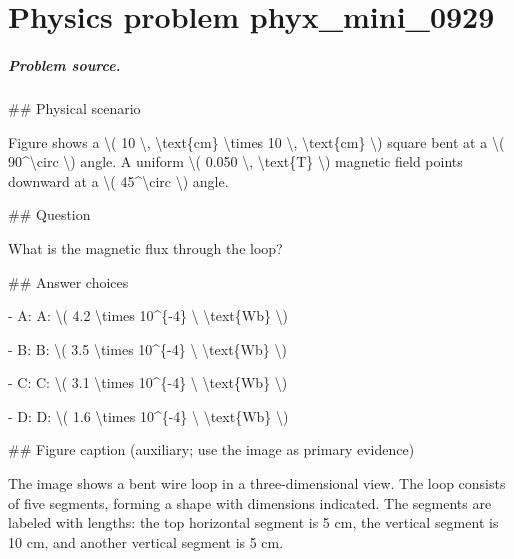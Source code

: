 
\chapter{Physics problem phyx\_mini\_0929}
\label{ch:PhyXMiniProblems_problem_phyx_mini_0929}

\paragraph{Problem source.}
\#\# Physical scenario

Figure shows a \textbackslash{}( 10 \textbackslash{}, \textbackslash{}text\{cm\} \textbackslash{}times 10 \textbackslash{}, \textbackslash{}text\{cm\} \textbackslash{}) square bent at a \textbackslash{}( 90\textasciicircum{}\textbackslash{}circ \textbackslash{}) angle. A uniform \textbackslash{}( 0.050 \textbackslash{}, \textbackslash{}text\{T\} \textbackslash{}) magnetic field points downward at a \textbackslash{}( 45\textasciicircum{}\textbackslash{}circ \textbackslash{}) angle.

\#\# Question

What is the magnetic flux through the loop?

\#\# Answer choices

- A: A: \textbackslash{}( 4.2 \textbackslash{}times 10\textasciicircum{}\{-4\} \textbackslash{} \textbackslash{}text\{Wb\} \textbackslash{})

- B: B: \textbackslash{}( 3.5 \textbackslash{}times 10\textasciicircum{}\{-4\} \textbackslash{} \textbackslash{}text\{Wb\} \textbackslash{})

- C: C: \textbackslash{}( 3.1 \textbackslash{}times 10\textasciicircum{}\{-4\} \textbackslash{} \textbackslash{}text\{Wb\} \textbackslash{})

- D: D: \textbackslash{}( 1.6 \textbackslash{}times 10\textasciicircum{}\{-4\} \textbackslash{} \textbackslash{}text\{Wb\} \textbackslash{})

\#\# Figure caption (auxiliary; use the image as primary evidence)

The image shows a bent wire loop in a three-dimensional view. The loop consists of five segments, forming a shape with dimensions indicated. The segments are labeled with lengths: the top horizontal segment is 5 cm, the vertical segment is 10 cm, and another vertical segment is 5 cm.

